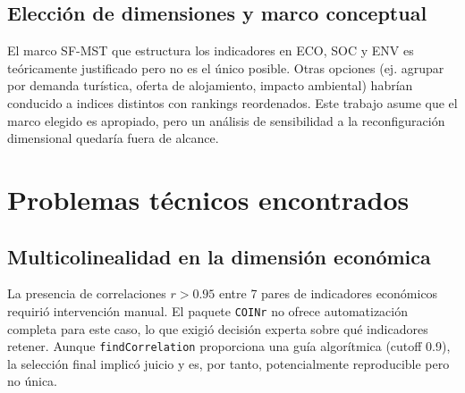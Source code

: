 \subsection{Elección de dimensiones y marco conceptual}

El marco SF-MST que estructura los indicadores en ECO, SOC y ENV es teóricamente justificado pero no es el único posible. Otras opciones (ej. agrupar por demanda turística, oferta de alojamiento, impacto ambiental) habrían conducido a indices distintos con rankings reordenados. Este trabajo asume que el marco elegido es apropiado, pero un análisis de sensibilidad a la reconfiguración dimensional quedaría fuera de alcance.

\section{Problemas técnicos encontrados}

\subsection{Multicolinealidad en la dimensión económica}

La presencia de correlaciones $r > 0.95$ entre 7 pares de indicadores económicos requirió intervención manual. El paquete \texttt{COINr} no ofrece automatización completa para este caso, lo que exigió decisión experta sobre qué indicadores retener. Aunque \texttt{findCorrelation} proporciona una guía algorítmica (cutoff 0.9), la selección final implicó juicio y es, por tanto, potencialmente reproducible pero no única.

